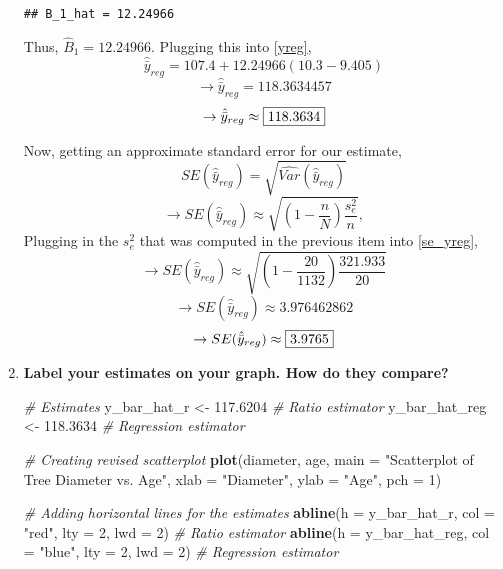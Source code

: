 \documentclass[]{article}
\newenvironment{Shaded}{\begin{snugshade}}{\end{snugshade}}
\newcommand{\AttributeTok}[1]{\textcolor[rgb]{0.13,0.29,0.53}{#1}}
\newcommand{\CommentTok}[1]{\textcolor[rgb]{0.56,0.35,0.01}{\textit{#1}}}
\newcommand{\DecValTok}[1]{\textcolor[rgb]{0.00,0.00,0.81}{#1}}
\newcommand{\FloatTok}[1]{\textcolor[rgb]{0.00,0.00,0.81}{#1}}
\newcommand{\FunctionTok}[1]{\textcolor[rgb]{0.13,0.29,0.53}{\textbf{#1}}}
\newcommand{\NormalTok}[1]{#1}
\newcommand{\OtherTok}[1]{\textcolor[rgb]{0.56,0.35,0.01}{#1}}
\newcommand{\StringTok}[1]{\textcolor[rgb]{0.31,0.60,0.02}{#1}}
\begin{document}
\begin{enumerate}[label=(\alph*)]
\begin{verbatim}
## B_1_hat = 12.24966
\end{verbatim}

Thus, $\hat B_1 = 12.24966$. Plugging this into \eqref{yreg}, 
\[
\hat{\bar y}_{reg} = 107.4 + 12.24966(10.3 - 9.405)
\]
\[
\rightarrow \hat{\bar y}_{reg} = 118.3634457
\]
\[
\rightarrow \hat{\bar y}_{reg} \approx \fbox{118.3634}
\]

Now, getting an approximate standard error for our estimate, 
\[
SE( \hat{\bar y}_{reg}) = \sqrt{\hat{Var}({\hat{\bar y}_{reg}})}
\]
\[
\rightarrow SE( \hat{\bar y}_{reg}) \approx \sqrt{\left(1-\frac{n}{N}\right)\frac{s_e^2}{n}}, \tag{4} \label{se_yreg}
\]
Plugging in the $s_e^2$ that was computed in the previous item into \eqref{se_yreg}, 
\[
\rightarrow SE( \hat{\bar y}_{reg}) \approx \sqrt{\left(1-\frac{20}{1132}\right)\frac{321.933}{20}}
\]
\[
\rightarrow SE( \hat{\bar y}_{reg}) \approx 3.976462862
\]
\[
\rightarrow SE( \hat{\bar y}_{reg}) \approx \fbox{3.9765}
\]

\item \textbf{Label your estimates on your graph. How do they compare?}

\begin{Shaded}
\begin{Highlighting}[]
\CommentTok{\# Estimates}
\NormalTok{y\_bar\_hat\_r }\OtherTok{\textless{}{-}} \FloatTok{117.6204} \CommentTok{\# Ratio estimator}
\NormalTok{y\_bar\_hat\_reg }\OtherTok{\textless{}{-}} \FloatTok{118.3634} \CommentTok{\# Regression estimator}

\CommentTok{\# Creating revised scatterplot}
\FunctionTok{plot}\NormalTok{(diameter, age,}
     \AttributeTok{main =} \StringTok{"Scatterplot of Tree Diameter vs. Age"}\NormalTok{,}
     \AttributeTok{xlab =} \StringTok{"Diameter"}\NormalTok{,}
     \AttributeTok{ylab =} \StringTok{"Age"}\NormalTok{,}
     \AttributeTok{pch =} \DecValTok{1}\NormalTok{)}

\CommentTok{\# Adding horizontal lines for the estimates }
\FunctionTok{abline}\NormalTok{(}\AttributeTok{h =}\NormalTok{ y\_bar\_hat\_r, }\AttributeTok{col =} \StringTok{"red"}\NormalTok{, }\AttributeTok{lty =} \DecValTok{2}\NormalTok{, }\AttributeTok{lwd =} \DecValTok{2}\NormalTok{) }\CommentTok{\# Ratio estimator }
\FunctionTok{abline}\NormalTok{(}\AttributeTok{h =}\NormalTok{ y\_bar\_hat\_reg, }\AttributeTok{col =} \StringTok{"blue"}\NormalTok{, }\AttributeTok{lty =} \DecValTok{2}\NormalTok{, }
       \AttributeTok{lwd =} \DecValTok{2}\NormalTok{) }\CommentTok{\# Regression estimator}


\end{Highlighting}
\end{Shaded}
\end{enumerate}
\end{document}
